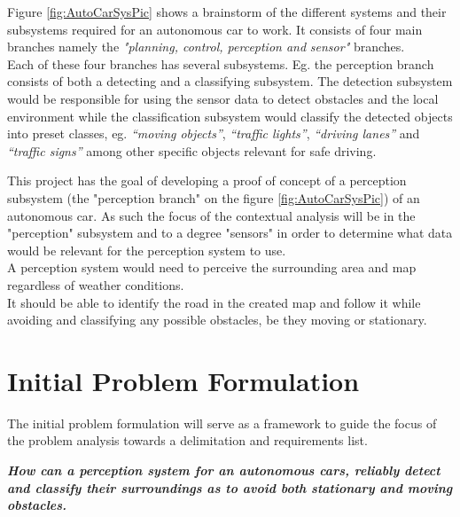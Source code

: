 Figure \ref{fig:AutoCarSysPic} shows a brainstorm of the different systems and their subsystems required for an autonomous car to work. It consists of four main branches namely the \textit{"planning, control, perception and} \textit{sensor"} branches. \\
Each of these four branches has several subsystems. Eg. the perception branch consists of both a detecting and a classifying subsystem. The detection subsystem would be responsible for using the sensor data to detect obstacles and the local environment while the classification subsystem would classify the detected objects into preset classes, eg. \textit{“moving objects”}, \textit{“traffic lights”}, \textit{“driving lanes”} and \textit{“traffic signs”} among other specific objects relevant for safe driving.

This project has the goal of developing a proof of concept of a perception subsystem (the "perception branch" on the figure \ref{fig:AutoCarSysPic}) of an autonomous car. As such the focus of the contextual analysis will be in the "perception" subsystem and to a degree "sensors" in order to determine what data would be relevant for the perception system to use. \\

A perception system would need to perceive the surrounding area and map regardless of weather conditions. \\
It should be able to identify the road in the created map and follow it while avoiding and classifying any possible obstacles, be they moving or stationary. 


\section{Initial Problem Formulation}
The initial problem formulation will serve as a framework to guide the focus of the problem analysis towards a delimitation and requirements list.\\ 

   \textbf{ \textit{How can a perception system for an autonomous cars, reliably detect and classify their surroundings as to avoid both stationary and moving obstacles.}}\\


